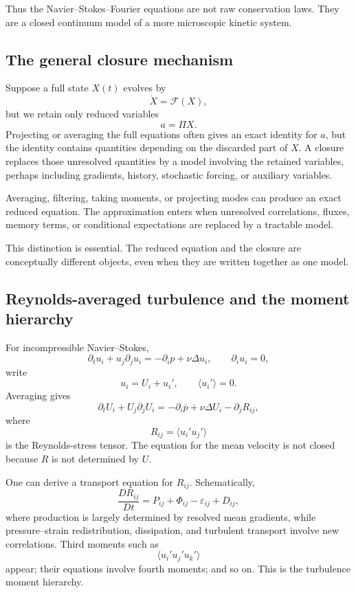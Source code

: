 \documentclass[11pt]{article}
\begin{document}
Thus the Navier--Stokes--Fourier equations are not raw conservation laws. They are a closed continuum model of a more microscopic kinetic system.

\subsection{The general closure mechanism}

Suppose a full state \(X(t)\) evolves by
\[
\dot X=\mathcal{F}(X),
\]
but we retain only reduced variables
\[
a=\Pi X.
\]
Projecting or averaging the full equations often gives an exact identity for \(a\), but the identity contains quantities depending on the discarded part of \(X\). A closure replaces those unresolved quantities by a model involving the retained variables, perhaps including gradients, history, stochastic forcing, or auxiliary variables.

\begin{takeaway}
Averaging, filtering, taking moments, or projecting modes can produce an exact reduced equation. The approximation enters when unresolved correlations, fluxes, memory terms, or conditional expectations are replaced by a tractable model.
\end{takeaway}

This distinction is essential. The reduced equation and the closure are conceptually different objects, even when they are written together as one model.

\subsection{Reynolds-averaged turbulence and the moment hierarchy}

For incompressible Navier--Stokes,
\begin{equation}
\partial_t u_i+u_j\partial_j u_i
=-\partial_i p+\nu\Delta u_i,
\qquad
\partial_i u_i=0,
\end{equation}
write
\[
u_i=U_i+u_i',
\qquad
\langle u_i'\rangle=0.
\]
Averaging gives
\begin{equation}
\partial_t U_i+U_j\partial_jU_i
=-\partial_i\overline p+\nu\Delta U_i-\partial_jR_{ij},
\end{equation}
where
\[
R_{ij}=\langle u_i'u_j'\rangle
\]
is the Reynolds-stress tensor. The equation for the mean velocity is not closed because \(R\) is not determined by \(U\).

One can derive a transport equation for \(R_{ij}\). Schematically,
\begin{equation}
\frac{D R_{ij}}{Dt}
=P_{ij}+\Phi_{ij}-\varepsilon_{ij}+D_{ij},
\end{equation}
where production is largely determined by resolved mean gradients, while pressure--strain redistribution, dissipation, and turbulent transport involve new correlations. Third moments such as
\[
\langle u_i'u_j'u_k'\rangle
\]
appear; their equations involve fourth moments; and so on. This is the turbulence moment hierarchy.
\end{document}
